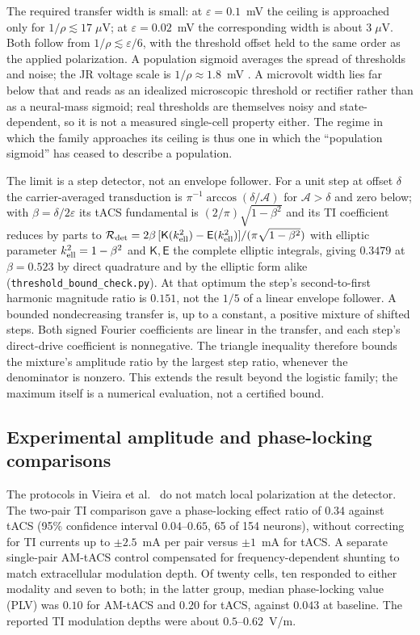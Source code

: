 \documentclass[11pt,a4paper]{article}
\begin{document}
The required transfer width is small: at $\varepsilon=0.1$~mV the ceiling is approached only for
$1/\rho\lesssim17\;\mu$V; at $\varepsilon=0.02$~mV the corresponding width is
about $3\;\mu$V. Both follow from $1/\rho\lesssim\varepsilon/6$, with the
threshold offset held to the same order as the applied polarization. A population
sigmoid averages the spread of thresholds and noise; the JR voltage scale is
$1/\rho\approx1.8$~mV \cite{jansen1995}. A
microvolt width lies far below that and reads as an idealized microscopic threshold or
rectifier rather than as a neural-mass sigmoid; real thresholds are themselves noisy and
state-dependent, so it is not a measured single-cell property either. The
regime in which the family approaches its ceiling is thus one in which the ``population
sigmoid'' has ceased to describe a population.

The limit is a step detector, not an envelope follower. For a unit step at offset
$\delta$ the carrier-averaged transduction is $\pi^{-1}\arccos(\delta/\mathcal A)$ for $\mathcal A>\delta$
and zero below; with $\beta=\delta/2\varepsilon$ its tACS fundamental is
$(2/\pi)\sqrt{1-\beta^2}$ and its TI coefficient reduces by parts to
$\mathcal R_{\rm det}=2\beta\,[\mathsf K(k_{\rm ell}^2)-\mathsf E(k_{\rm ell}^2)]/(\pi\sqrt{1-\beta^2})$
with elliptic parameter $k_{\rm ell}^2=1-\beta^2$ and $\mathsf K,\mathsf E$
the complete elliptic integrals, giving $0.3479$ at $\beta=0.523$ by direct quadrature and
by the elliptic form alike (\texttt{threshold\_bound\_check.py}). At that optimum the
step's second-to-first harmonic magnitude ratio is $0.151$, not the $1/5$ of a linear
envelope follower. A bounded nondecreasing transfer is, up to a constant, a positive
mixture of shifted steps. Both signed Fourier coefficients are linear in the
transfer, and each step's direct-drive coefficient is nonnegative. The triangle
inequality therefore bounds the mixture's amplitude ratio by the largest step
ratio, whenever the denominator is nonzero. This extends the result beyond the
logistic family; the maximum itself is a numerical evaluation, not a certified bound.

\subsection{Experimental amplitude and phase-locking comparisons}\label{supp:vieira}
The protocols in Vieira et al.\ \cite{vieira2024} do not match local polarization at the detector.
The two-pair TI comparison gave a phase-locking effect ratio of $0.34$ against
tACS (95\% confidence interval $0.04$--$0.65$, 65 of 154 neurons), without
correcting for TI currents up to $\pm2.5$~mA per pair versus $\pm1$~mA for tACS.
A separate single-pair AM-tACS control compensated for frequency-dependent
shunting to match extracellular modulation depth. Of twenty cells, ten responded
to either modality and seven to both; in the latter group, median phase-locking
value (PLV) was $0.10$ for AM-tACS and $0.20$ for tACS, against $0.043$ at baseline.
The reported TI modulation depths were about $0.5$--$0.62$~V/m.
\end{document}
